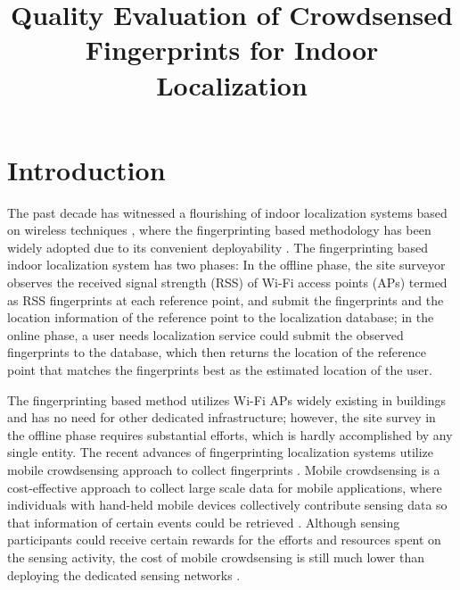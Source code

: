 \documentclass[10pt,conference,compsocconf,letterpaper]{IEEEtran}
\begin{document}
\title{Quality Evaluation of Crowdsensed Fingerprints for Indoor Localization}

%
%

\maketitle

\newtheorem{Lemma}{Lemma}

\begin{abstract}

\end{abstract}


\section{Introduction}\label{sectionintro}
The past decade has witnessed a flourishing of indoor localization systems based on wireless techniques \cite{ rsscsi}, where the fingerprinting based methodology has been widely adopted due to its convenient deployability \cite{ mobicom04, horus }. The fingerprinting based indoor localization system has two phases: In the offline phase, the site surveyor observes the received signal strength (RSS) of Wi-Fi access points (APs) termed as RSS fingerprints at each reference point, and submit the fingerprints and the location information of the reference point to the localization database; in the online phase, a user needs localization service could submit the observed fingerprints to the database, which then returns the location of the reference point that matches the fingerprints best as the estimated location of the user.   

The fingerprinting based method utilizes Wi-Fi APs widely existing in buildings and has no need for other dedicated infrastructure; however, the site survey in the offline phase requires substantial efforts, which is hardly accomplished by any single entity. The recent advances of fingerprinting localization systems utilize mobile crowdsensing approach to collect fingerprints \cite{ wen2015fundamental, Chenshu14, luo2014piloc, shen2013walkie, ez10, Chintalapudi10}. Mobile crowdsensing is a cost-effective approach to collect large scale data for mobile applications, where individuals with hand-held mobile devices collectively contribute sensing data so that information of certain events could be retrieved \cite{crowdsensing, postedpricing}. Although sensing participants could receive certain rewards for the efforts and resources spent on the sensing activity, the cost of mobile crowdsensing is still much lower than deploying the dedicated sensing networks \cite{ crowdsensing}. 
\end{document}
